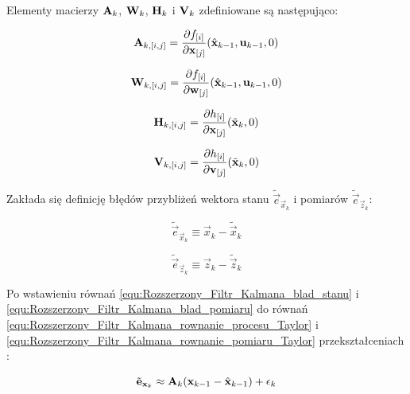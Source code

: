 \noindent
Elementy macierzy $\mathbf{A}_k$, $\mathbf{W}_k$, $\mathbf{H}_k$ i $\mathbf{V}_k$ zdefiniowane są następująco:

\begin{equation}
\label{equ:Rozszerzony_Filtr_Kalmana_macierz_A}
	\matr{A}_{k,[i,j]} = \frac{\partial f_{[i]}}{\partial \vec{x}_{[j]}} (\hat{\vec{x}}_{k-1}, \vec{u}_{k-1}, 0)
\end{equation}

\begin{equation}
\label{equ:Rozszerzony_Filtr_Kalmana_macierz_W}
	\matr{W}_{k,[i,j]} = \frac{\partial f_{[i]}}{\partial \vec{w}_{[j]}} (\hat{\vec{x}}_{k-1}, \vec{u}_{k-1}, 0)
\end{equation}

\begin{equation}
\label{equ:Rozszerzony_Filtr_Kalmana_macierz_H}
	\mathbf{H}_{k,[i,j]} = \frac{\partial h_{[i]}}{\partial \mathbf{x}_{[j]}} (\tilde{\mathbf{x}}_k, 0)
\end{equation}

\begin{equation}
\label{equ:Rozszerzony_Filtr_Kalmana_macierz_V}
	\mathbf{V}_{k,[i,j]} = \frac{\partial h_{[i]}}{\partial \mathbf{v}_{[j]}} (\tilde{\mathbf{x}}_k, 0)
\end{equation}

\noindent
Zakłada się definicję błędów przybliżeń wektora stanu $\tilde{\vec{e}}_{\vec{x}_k}$ i pomiarów $\tilde{\vec{e}}_{\vec{z}_k}$:

\begin{equation}
\label{equ:Rozszerzony_Filtr_Kalmana_blad_stanu}
	\tilde{\vec{e}}_{\vec{x}_k} \equiv \vec{x}_k - \tilde{\vec{x}}_k
\end{equation}

\begin{equation}
\label{equ:Rozszerzony_Filtr_Kalmana_blad_pomiaru}
	\tilde{\vec{e}}_{\vec{z}_k} \equiv \vec{z}_k - \tilde{\vec{z}}_k
\end{equation}

Po wstawieniu równań \ref{equ:Rozszerzony_Filtr_Kalmana_blad_stanu} i \ref{equ:Rozszerzony_Filtr_Kalmana_blad_pomiaru} do równań \ref{equ:Rozszerzony_Filtr_Kalmana_rownanie_procesu_Taylor} i \ref{equ:Rozszerzony_Filtr_Kalmana_rownanie_pomiaru_Taylor} przekształceniach \cite{Welch1995}:

\begin{equation}
\label{equ:Rozszerzony_Filtr_Kalmana_blad_stanu_cd}
	\tilde{\vec{e}}_{\vec{x}_k} \approx \matr{A}_k(\vec{x}_{k-1} - \hat{\vec{x}}_{k-1}) + \vec{\epsilon}_k
\end{equation}

